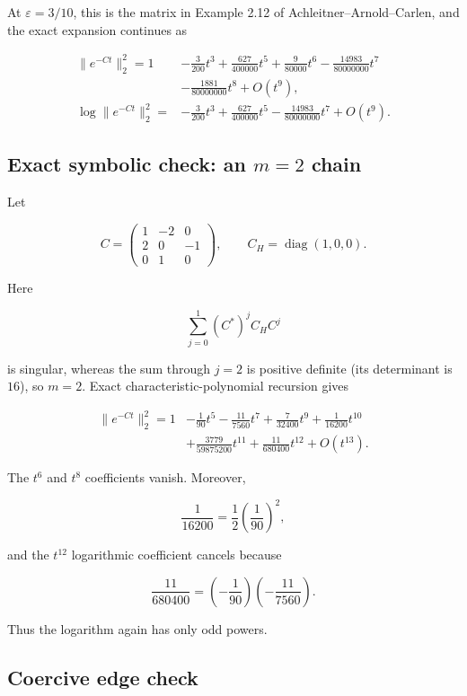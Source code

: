 \documentclass[11pt,a4paper]{article}
\begin{document}
At \(\varepsilon=3/10\), this is the matrix in Example 2.12 of Achleitner--Arnold--Carlen, and the exact expansion continues as

\[
\begin{aligned}
\|e^{-Ct}\|_2^2=1
&-\frac{3}{200}t^3
+\frac{627}{400000}t^5
+\frac{9}{80000}t^6
-\frac{14983}{80000000}t^7\\
&-\frac{1881}{80000000}t^8+O(t^9),\\
\log\|e^{-Ct}\|_2^2=
&-\frac{3}{200}t^3
+\frac{627}{400000}t^5
-\frac{14983}{80000000}t^7+O(t^9).
\end{aligned}
\]

\subsection{\texorpdfstring{Exact symbolic check: an \(m=2\) chain}{Exact symbolic check: an m=2 chain}}\label{exact-symbolic-check-an-m2-chain}

Let

\[
C=
\begin{pmatrix}
1&-2&0\\
2&0&-1\\
0&1&0
\end{pmatrix},\qquad C_H=\operatorname{diag}(1,0,0).
\]

Here

\[
\sum_{j=0}^{1}(C^*)^jC_HC^j
\]

is singular, whereas the sum through \(j=2\) is positive definite (its determinant is \(16\)), so \(m=2\). Exact characteristic-polynomial recursion gives

\[
\begin{aligned}
\|e^{-Ct}\|_2^2=1
&-\frac1{90}t^5
-\frac{11}{7560}t^7
+\frac7{32400}t^9
+\frac1{16200}t^{10}\\
&+\frac{3779}{59875200}t^{11}
+\frac{11}{680400}t^{12}+O(t^{13}).
\end{aligned}
\]

The \(t^6\) and \(t^8\) coefficients vanish. Moreover,

\[
\frac1{16200}=\frac12\left(\frac1{90}\right)^2,
\]

and the \(t^{12}\) logarithmic coefficient cancels because

\[
\frac{11}{680400}
=\left(-\frac1{90}\right)\left(-\frac{11}{7560}\right).
\]

Thus the logarithm again has only odd powers.

\subsection{Coercive edge check}\label{coercive-edge-check}
\end{document}
